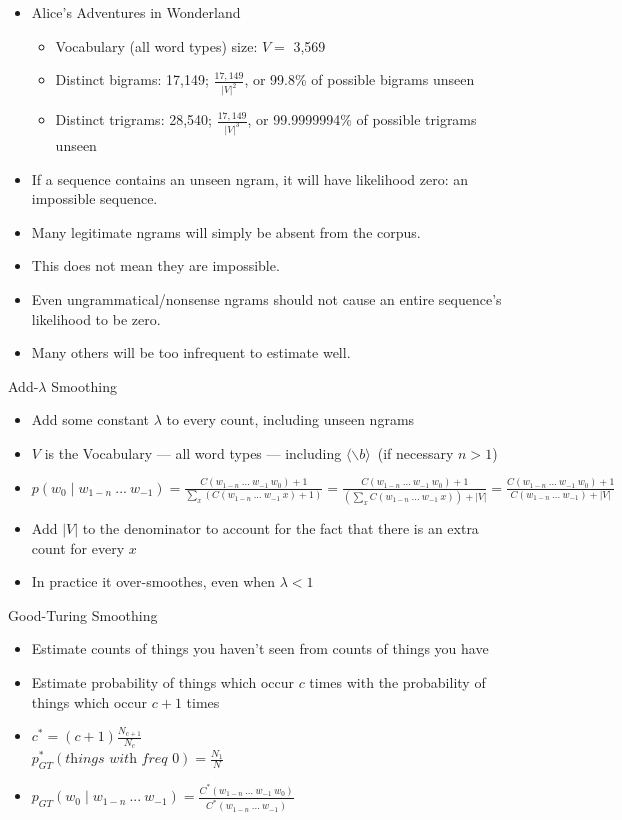 \documentclass[11pt,letterpaper]{article}
\newcommand{\ngramend}{\ensuremath{\langle \backslash b \rangle}}
\begin{document}
\begin{itemize}
  \item Alice's Adventures in Wonderland
    \begin{itemize}
      \item Vocabulary (all word types) size: $V=$ 3,569
      \item Distinct bigrams:  17,149; $\frac{17,149}{|V|^2}$, or 99.8\% of possible bigrams unseen
      \item Distinct trigrams: 28,540; $\frac{17,149}{|V|^3}$, or 99.9999994\% of possible trigrams unseen
    \end{itemize}
  \item If a sequence contains an unseen ngram, it will have likelihood zero: an impossible sequence.
  \item Many legitimate ngrams will simply be absent from the corpus.
  \item This does not mean they are impossible.
  \item Even ungrammatical/nonsense ngrams should not cause an entire sequence's likelihood to be zero.
  \item Many others will be too infrequent to estimate well.
\end{itemize}


Add-$\lambda$ Smoothing

\begin{itemize}
  \item Add some constant $\lambda$ to every count, including unseen ngrams
  \item $V$ is the Vocabulary --- all word types --- including \ngramend\ (if necessary $n>1$)
  \item $p(w_0 \mid w_{1-n}~...~w_{-1}) = 
         \frac{C(w_{1-n}~...~w_{-1}~w_0)+1}{\sum_x (C(w_{1-n}~...~w_{-1}~x) + 1)} =
         \frac{C(w_{1-n}~...~w_{-1}~w_0)+1}{(\sum_x C(w_{1-n}~...~w_{-1}~x))+|V|} =
         \frac{C(w_{1-n}~...~w_{-1}~w_0)+1}{C(w_{1-n}~...~w_{-1})+|V|}$
  \item Add $|V|$ to the denominator to account for the fact that there is an extra count for every $x$
  \item In practice it over-smoothes, even when $\lambda < 1$
\end{itemize}


Good-Turing Smoothing

\begin{itemize}
  \item Estimate counts of things you haven't seen from counts of things you have
  \item Estimate probability of things which occur $c$ times with the probability of things which occur $c+1$ times
  \item $c^* = (c+1) \frac{N_{c+1}}{N_c}$ \vspace{2mm} \\
        $p^*_{GT}(\textit{things with freq 0}) = \frac{N_1}{N}$
  \item $p_{GT}(w_0 \mid w_{1-n}~...~w_{-1}) = 
         \frac{C^*(w_{1-n}~...~w_{-1}~w_0)}{C^*(w_{1-n}~...~w_{-1})}$
\end{itemize}
\end{document}
